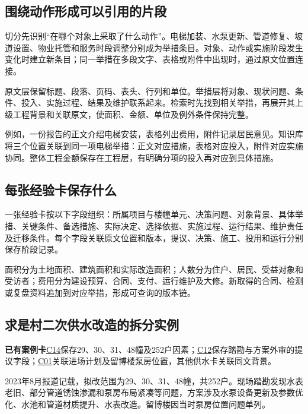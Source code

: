 \documentclass[UTF8,11pt,fontset=windows]{ctexart}
\newcommand{\field}[2]{\par\noindent\textbf{#1}\quad #2\par}
\begin{document}
\subsection{围绕动作形成可以引用的片段}

切分先识别“在哪个对象上采取了什么动作”。电梯加装、水泵更新、管道修复、坡道设置、物业托管和服务时段调整分别成为举措条目。对象、动作或实施阶段发生变化时建立新条目；同一举措在多段文字、表格或附件中出现时，通过原文位置连接。

原文层保留标题、段落、页码、表头、行列和单位。举措层将对象、现状问题、条件、投入、实施过程、结果及维护联系起来。检索时先找到相关举措，再展开其上级工程背景和关联原文，使面积、金额、单位及例外条件保持完整。

例如，一份报告的正文介绍电梯安装，表格列出费用，附件记录居民意见。知识库将三个位置关联到同一项电梯举措：正文对应措施，表格对应投入，附件对应实施协同。整体工程金额保存在工程层，有明确分项的投入再对应到具体措施。

\subsection{每张经验卡保存什么}

一张经验卡按以下字段组织：所属项目与楼幢单元、决策问题、对象背景、具体举措、关键条件、备选措施、实际决定、选择依据、实施过程、运行结果、维护责任及迁移条件。每个字段关联原文位置和版本，提议、决策、施工、投用和运行分别保存阶段记录。

面积分为土地面积、建筑面积和实际改造面积；人数分为住户、居民、受益对象和受访者；费用分为建设预算、合同、支付、运行维护及大修。新取得的合同、检测或复盘资料追加到对应举措，形成可查询的版本链。

\subsection{求是村二次供水改造的拆分实例}

\field{已有案例卡}{\hyperlink{EXP-8fb43037-0680-4136-8844-edcb789391f4}{C14}保存29、30、31、48幢及252户因素；\hyperlink{EXP-89d54bcc-fc1f-4431-be62-7a06bce77e41}{C12}保存踏勘与方案外审的提议字段；\hyperlink{EXP-16120dfe-9d94-4394-8880-494b385cf2d2}{C01}关联进场计划及留博楼泵房位置，其他供水卡关联同文背景。}

2023年8月报道记载，拟改范围为29、30、31、48幢，共252户。现场踏勘发现水表老旧、部分管道锈蚀渗漏和泵房布局紧凑等问题，方案涉及水泵设备更新及参数优化、水池和管道材质提升、水表改造。留博楼因当时泵房位置问题单列。\cite{water}
\end{document}

